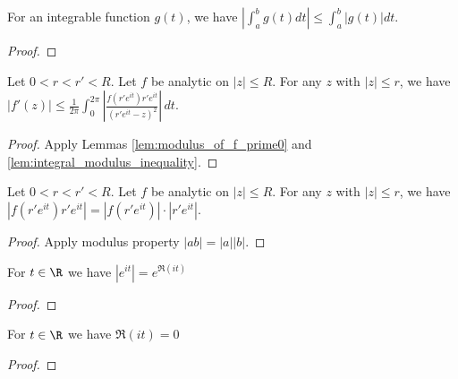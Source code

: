 
\begin{lemma} \label{lem:integral_modulus_inequality}
\leanok
{}
For an integrable function $g(t)$, we have $|\int_a^b g(t) dt| \le \int_a^b |g(t)| dt$.
\end{lemma}
\begin{proof}
\leanok
\end{proof}


\begin{lemma}[Modulus of $f'$]\label{lem:modulus_of_f_prime} \leanok
Let $0 < r < r' < R$.  Let $f$ be analytic on $|z| \le R$. For any $z$ with $|z| \le r$, we have
$|f'(z)| \le \frac{1}{2\pi} \int_{0}^{2\pi} \left|\frac{f(r'e^{it}) r'e^{it}}{(r'e^{it}-z)^2} \right| \, dt$.
\end{lemma}
\begin{proof}\leanok
{}
Apply Lemmas \ref{lem:modulus_of_f_prime0} and \ref{lem:integral_modulus_inequality}.
\end{proof}



\begin{lemma}\label{lem:modulus_of_integrand_product2} \leanok
Let $0 < r < r' < R$. Let $f$ be analytic on $|z| \le R$. For any $z$ with $|z| \le r$, we have
$|f(r'e^{it}) r'e^{it}| = |f(r'e^{it})| \cdot |r'e^{it}|$.
\end{lemma}
\begin{proof}\leanok
Apply modulus property $|ab|=|a||b|$.
\end{proof}




\begin{lemma}\label{lem:modeit} \leanok
For $t\in\R$ we have $|e^{it}| = e^{\Re(it)}$
\end{lemma}
\begin{proof}\leanok
\end{proof}



\begin{lemma} \label{lem:Reit0} \leanok
For $t\in\R$ we have $\Re(it) = 0$
\end{lemma}
\begin{proof}\leanok
\end{proof}

